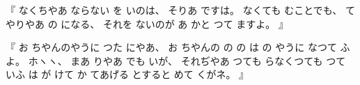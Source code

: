 %
『
なくちやあ
ならない
を
いのは、
%
そりあ
ですは。
%
%
なくても
むことでも、
%
て
やりやあ
の
になる、
%
それを
ないのが
あ
かと
つて
ますよ。
』

%
『
お
ちやんのやうに
つた
にやあ、
%
お
ちやんの
の
%
の
は
の
やうに
なつて
ふよ。
%
ホヽヽ、
%
まあ
りやあ
でも
いが、
%
それぢやあ
つても
らなくつても
つて
いふ
は
が
けて
か
てあげる
とすると
めて
くがネ。
』
